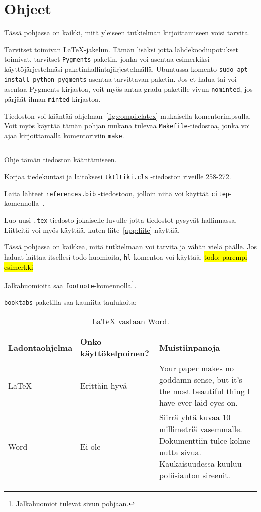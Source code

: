 \section{Ohjeet}

Tässä pohjassa on kaikki, mitä yleiseen tutkielman kirjoittamiseen voisi
tarvita.

Tarvitset toimivan LaTeX-jakelun. Tämän lisäksi jotta lähdekoodiupotukset
toimivat, tarvitset \texttt{Pygments}-paketin, jonka voi asentaa esimerkiksi
käyttöjärjestelmäsi paketinhallintajärjestelmällä. Ubuntussa komento
\texttt{sudo apt install python-pygments} asentaa tarvittavan paketin. Jos et
halua tai voi asentaa Pygments-kirjastoa, voit myös antaa gradu-paketille vivun
\texttt{nominted}, jos pärjäät ilman \texttt{minted}-kirjastoa.

Tiedoston voi kääntää ohjelman~\ref{fig:compilelatex} mukaisella
komentorimpsulla. Voit myös käyttää tämän pohjan mukana tulevaa
\texttt{Makefile}-tiedostoa, jonka voi ajaa kirjoittamalla komentoriviin
\texttt{make}.

\begin{listing}[ht!]
    \inputminted{Shell}{compile.sh}
    \caption{Ohje tämän tiedoston kääntämiseen.}
    \label{fig:compilelatex}
\end{listing}

Korjaa tiedekuntasi ja laitoksesi \texttt{tktltiki.cls} -tiedoston riveille 258-272.

Laita lähteet \texttt{references.bib} -tiedostoon, jolloin niitä voi
käyttää \texttt{citep}-komennolla~\citep{latexpohja}.

Luo uusi \texttt{.tex}-tiedosto jokaiselle luvulle jotta tiedostot pysyvät
hallinnassa. Liitteitä voi myös käyttää, kuten liite~\ref{app:liite} näyttää.

Tässä pohjassa on kaikkea, mitä tutkielmaan voi tarvita ja vähän vielä päälle.
Jos haluat laittaa itsellesi todo-huomioita, \texttt{hl}-komentoa voi käyttää.
\hl{todo: parempi esimerkki}

Jalkahuomioita saa \texttt{footnote}-komennolla\footnote{Jalkahuomiot tulevat
sivun pohjaan.}.

\newpage

\texttt{booktabs}-paketilla saa kauniita taulukoita:

\begin{table}[ht!]
    \begin{tabular}{@{}llp{8.5cm}@{}} \toprule
    Ladontaohjelma & Onko käyttökelpoinen? & Muistiinpanoja \\ \midrule
    \LaTeX         & Erittäin hyvä         & Your paper makes no goddamn sense, but it's the most beautiful thing I have ever laid eyes on. \\
    Word           & Ei ole                & Siirrä yhtä kuvaa 10 millimetriä vasemmalle. Dokumenttiin tulee kolme uutta sivua. Kaukaisuudessa kuuluu poliisiauton sireenit. \\ \bottomrule
    \end{tabular}

    \caption{LaTeX vastaan Word.}
    \label{table:properties}
\end{table}
